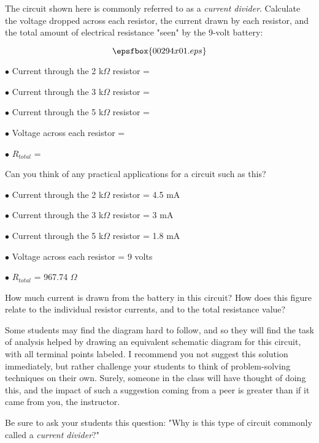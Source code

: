 

The circuit shown here is commonly referred to as a {\it current divider}.  Calculate the voltage dropped across each resistor, the current drawn by each resistor, and the total amount of electrical resistance "seen" by the 9-volt battery:

$$\epsfbox{00294x01.eps}$$

\medskip
\item{$\bullet$} Current through the 2 k$\Omega$ resistor = 
\item{$\bullet$} Current through the 3 k$\Omega$ resistor = 
\item{$\bullet$} Current through the 5 k$\Omega$ resistor = 
\item{$\bullet$} Voltage across each resistor = 
\item{$\bullet$} $R_{total}$ = 
\medskip

Can you think of any practical applications for a circuit such as this?







\medskip
\item{$\bullet$} Current through the 2 k$\Omega$ resistor = 4.5 mA
\item{$\bullet$} Current through the 3 k$\Omega$ resistor = 3 mA
\item{$\bullet$} Current through the 5 k$\Omega$ resistor = 1.8 mA
\item{$\bullet$} Voltage across each resistor = 9 volts
\item{$\bullet$} $R_{total}$ = 967.74 $\Omega$
\medskip

How much current is drawn from the battery in this circuit?  How does this figure relate to the individual resistor currents, and to the total resistance value?







Some students may find the diagram hard to follow, and so they will find the task of analysis helped by drawing an equivalent schematic diagram for this circuit, with all terminal points labeled.  I recommend you not suggest this solution immediately, but rather challenge your students to think of problem-solving techniques on their own.  Surely, someone in the class will have thought of doing this, and the impact of such a suggestion coming from a peer is greater than if it came from you, the instructor.

Be sure to ask your students this question: "Why is this type of circuit commonly called a {\it current divider}?"





